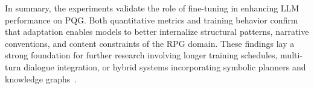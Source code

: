 In summary, the experiments validate the role of fine-tuning in enhancing LLM performance
on PQG. Both quantitative metrics and training behavior confirm that adaptation
enables models to better internalize structural patterns, narrative conventions,
and content constraints of the RPG domain. These findings lay a strong foundation for further
research involving longer training schedules, multi-turn dialogue integration, or hybrid
systems incorporating symbolic planners and knowledge graphs~\cite{ashby2023personalized}.

\newpage
